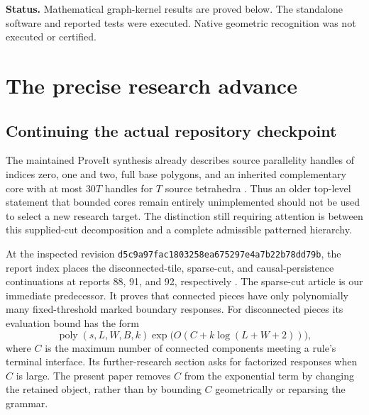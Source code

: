 \documentclass[11pt,letterpaper]{article}
\theoremstyle{definition}
\theoremstyle{remark}\newtheorem{remark}[theorem]{Remark}
\newcommand{\poly}{\operatorname{poly}}
\DeclareRobustCommand{\code}[1]{\nolinkurl{#1}}
\newcommand{\pin}{\code{d5c9a97fac1803258ea675297e4a7b22b78dd79b}}
\begin{document}
\begin{titlepage}
\begin{abstract}
We also construct an equivariant coloring DAG: one recipe works for every assignment of visible component colors, so witness extraction does not restore the eliminated exponential factor. A separate verifier checks complete atlases and symbolic positive witnesses. The delivery includes source-schema compatibility with ProveIt report 91, exhaustive and randomized finite checks, binary stress cases, and paired timings, including regressions. The graph theorem is unconditional for its stated input model; a general quasi-polynomial knot recognizer still requires faithful geometric grammar production, disc transport, and global hierarchy accounting.
\end{abstract}
\vfill
{\small\textbf{Status.} Mathematical graph-kernel results are proved below. The standalone software and reported tests were executed. Native geometric recognition was not executed or certified.}
\end{titlepage}
\tableofcontents
\clearpage

\section{The precise research advance}
\label{sec:advance}
\subsection{Continuing the actual repository checkpoint}
The maintained ProveIt synthesis already describes source parallelity handles of indices zero, one and two, full base polygons, and an inherited complementary core with at most $30T$ handles for $T$ source tetrahedra \cite{parallelity}. Thus an older top-level statement that bounded cores remain entirely unimplemented should not be used to select a new research target. The distinction still requiring attention is between this supplied-cut decomposition and a complete admissible patterned hierarchy.

At the inspected revision \pin, the report index places the disconnected-tile, sparse-cut, and causal-persistence continuations at reports 88, 91, and 92, respectively \cite{index}. The sparse-cut article \cite{sparse} is our immediate predecessor. It proves that connected pieces have only polynomially many fixed-threshold marked boundary responses. For disconnected pieces its evaluation bound has the form
\begin{equation}\label{eq:old}
 \poly(s,L,W,B,k)\exp\!\bigl(O(C+k\log(L+W+2))\bigr),
\end{equation}
where $C$ is the maximum number of connected components meeting a rule's terminal interface. Its further-research section asks for factorized responses when $C$ is large. The present paper removes $C$ from the exponential term by changing the retained object, rather than by bounding $C$ geometrically or reparsing the grammar.
\end{document}
